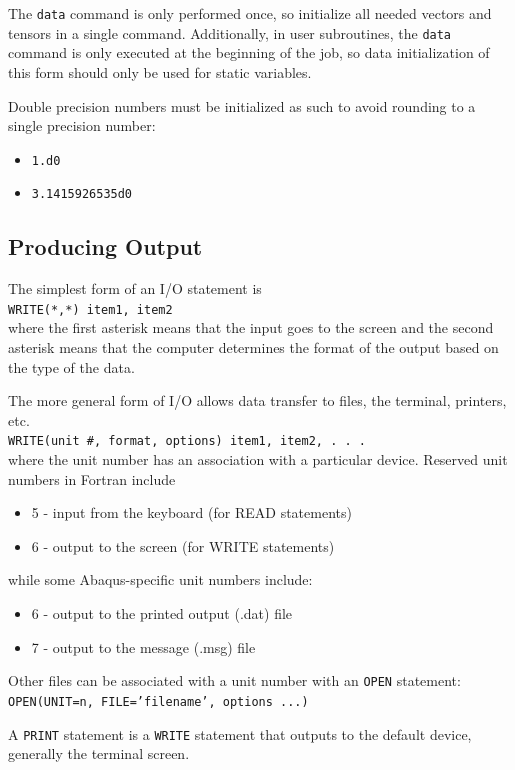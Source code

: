 \documentclass[10pt,letterpaper,oneside]{report}
\begin{document}
The \texttt{data} command is only performed once, so initialize all needed vectors and tensors in a single command.  Additionally, in user subroutines, the \texttt{data} command is only executed at the beginning of the job, so data initialization of this form should only be used for static variables.

Double precision numbers must be initialized as such to avoid rounding to a single precision number: 
\begin{itemize}
\item \texttt{1.d0}
\item \texttt{3.1415926535d0}
\end{itemize}

\subsection{Producing Output}

The simplest form of an I/O statement is \\
\texttt{WRITE(*,*)  item1, item2} \\
where the first asterisk means that the input goes to the screen and the second asterisk means that the computer determines the format of the output based on the type of the data.

The more general form of I/O allows data transfer to files, the terminal, printers, etc.\\
\texttt{WRITE(unit \#, format, options) item1, item2, . . . } \\
where the unit number has an association with a particular device.  Reserved unit numbers in Fortran include
\begin{itemize}
\item 5 - input from the keyboard (for READ statements)
\item 6 - output to the screen (for WRITE statements)
\end{itemize}
while some Abaqus-specific unit numbers include:
\begin{itemize}
\item 6 - output to the printed output (.dat) file
\item 7 - output to the message (.msg) file
\end{itemize}
Other files can be associated with a unit number with an \texttt{OPEN} statement: \\
\texttt{OPEN(UNIT=n, FILE='filename', options ...)}

A \texttt{PRINT} statement is a \texttt{WRITE} statement that outputs to the default device, generally the terminal screen.  
\end{document}
